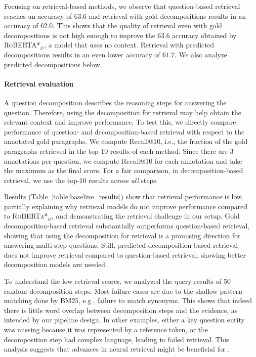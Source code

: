 {Focusing on retrieval-based methods, we observe that question-based retrieval reaches an accuracy of $63.6$ and retrieval with gold decompositions results in an accuracy of $62.0$. This shows that the quality of retrieval even with gold decompositions is not high enough to improve the $63.6$ accuracy obtained by \textsc{RoBERTA*$_\varnothing$}, a model that uses no context. Retrieval with predicted decompositions results in an even lower accuracy of $61.7$. We also analyze predicted decompositions below.

\paragraph{Retrieval evaluation}
A question decomposition describes the reasoning steps for answering the question. Therefore, using the decomposition for retrieval may help obtain the relevant context and improve performance. 
To test this, we directly compare performance of question- and decomposition-based retrieval with respect to the annotated gold paragraphs. 
We compute Recall@10, i.e., the fraction of the gold paragraphs retrieved in the top-10 results of each method. Since there are 3 annotations per question, we compute Recall@10 for each annotation and take the maximum as the final score. For a fair comparison, in decomposition-based retrieval, we use the top-10 results across \emph{all} steps.

Results (Table~\ref{table:baseline_results}) show that retrieval performance is low, partially explaining why retrieval models do not improve performance compared to \textsc{RoBERTa*$_\varnothing$},
and demonstrating the retrieval challenge in our setup. Gold decomposition-based retrieval substantially outperforms question-based retrieval, showing that using the decomposition for retrieval is a promising direction for answering multi-step questions. Still, predicted decomposition-based retrieval does not improve retrieval compared to question-based retrieval, showing better decomposition models are needed.

To understand the low retrieval scores, we analyzed the query results of 50 random decomposition steps. Most failure cases are due to the shallow pattern matching done by BM25, e.g., failure to match synonyms. This shows that indeed there is little word overlap between decomposition steps and the evidence, as intended by our pipeline design. In other examples, either a key question entity was missing because it was represented by a reference token, or the decomposition step had complex language, leading to failed retrieval.
This analysis suggests that 
advances in neural retrieval might be beneficial for \strategyqa{}.

}
